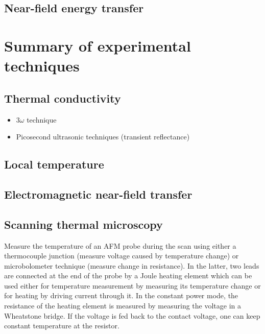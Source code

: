 
\subsection{Near-field energy transfer}

\section{Summary of experimental techniques}

\subsection{Thermal conductivity}

\begin{itemize}
 \item $3\omega$ technique
 \item Picosecond ultrasonic techniques (transient reflectance)
\end{itemize}

\subsection{Local temperature}

\subsection{Electromagnetic near-field transfer}

\subsection{Scanning thermal microscopy}

Measure the temperature of an AFM probe during the scan using either a thermocouple junction (measure voltage caused by temperature change) or microbolometer technique (measure change in resistance). In the latter, two leads are connected at the end of the probe by a Joule heating element which can be used either for temperature measurement by measuring its temperature change or for heating by driving current through it. In the constant power mode, the resistance of the heating element is measured by measuring the voltage in a Wheatstone bridge. If the voltage is fed back to the contact voltage, one can keep constant temperature at the resistor. 

